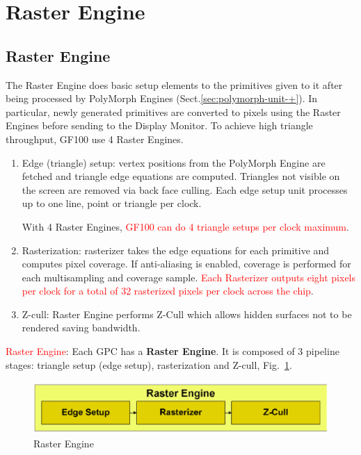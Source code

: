 \section{Raster Engine}


\subsection{Raster Engine}
\label{sec:raster_engine}

The Raster Engine does basic setup elements to the primitives given to it after
being processed by PolyMorph Engines (Sect.\ref{sec:polymorph-unit-+}).
In particular, newly generated primitives are converted to pixels using the
Raster Engines before sending to the Display Monitor. To achieve high triangle
throughput, GF100 use 4 Raster Engines.
\begin{enumerate}
\item Edge (triangle) setup: vertex positions from the PolyMorph
  Engine are fetched and triangle edge equations are
  computed. Triangles not visible on the screen are removed via back
  face culling. Each edge setup unit processes up to one line, point
  or triangle per clock. 

  With 4 Raster Engines,
  \textcolor{red}{ GF100 can do 4 triangle setups per clock maximum}.

\item Rasterization: rasterizer takes the edge equations for each
  primitive and computes pixel coverage. If anti-aliasing is enabled,
  coverage is performed for each multisampling and coverage sample.
  \textcolor{red}{Each Rasterizer outputs eight pixels per clock for a
    total of 32 rasterized pixels per clock across the chip}.

\item Z-cull: Raster Engine performs Z-Cull which allows hidden
  surfaces not to be rendered saving bandwidth.
\end{enumerate}

\textcolor{red}{Raster Engine}: Each GPC has a {\bf Raster Engine}. It is
composed of 3 pipeline stages: triangle setup (edge setup), rasterization and
Z-cull, Fig.~\ref{fig:raster_engine}.

\begin{figure}[hbt]
  \centerline{\includegraphics[height=2cm,
    angle=0]{./images/raster_engine.eps}}
\caption{Raster Engine}
\label{fig:raster_engine}
\end{figure}



